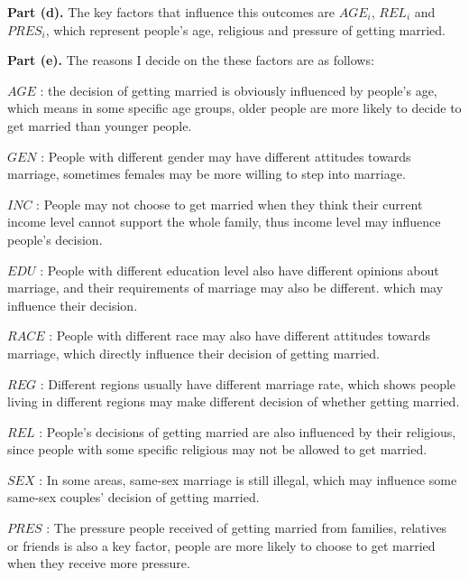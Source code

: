 \documentclass[letterpaper,12pt]{article}
\theoremstyle{definition}
\begin{document}
\noindent\textbf{Part (d).} The key factors that influence this outcomes are $AGE_{i}$, $REL_{i}$ and $PRES_{i}$, which represent people's age, religious and pressure of getting married.

\noindent\textbf{Part (e).} The reasons I decide on the these factors are as follows: 

\noindent  $AGE$ : the decision of getting married is obviously influenced by people's age, which means in some specific age groups, older people are more likely to decide to get married than younger people.

\noindent $GEN$ : People with different gender may have different attitudes towards marriage, sometimes females may be more willing to step into marriage.

\noindent $INC$ : People may not choose to get married when they think their current income level cannot support the whole family, thus income level may influence people's decision.

\noindent $EDU$ : People with different education level also have different opinions about marriage, and their requirements of marriage may also be different. which may influence their decision.

\noindent $RACE$ : People with different race may also have different attitudes towards marriage, which directly influence their decision of getting married.

\noindent $REG$ : Different regions usually have different marriage rate, which shows people living in different regions may make different decision of whether getting married.

\noindent $REL$ : People's decisions of getting married are also influenced by their religious, since people with some specific religious may not be allowed to get married.

\noindent $SEX$ : In some areas, same-sex marriage is still illegal, which may influence some same-sex couples' decision of getting married.

\noindent $PRES$ : The pressure people received of getting married from families, relatives or friends is also a key factor, people are more likely to choose to get married when they receive more pressure.
\end{document}

